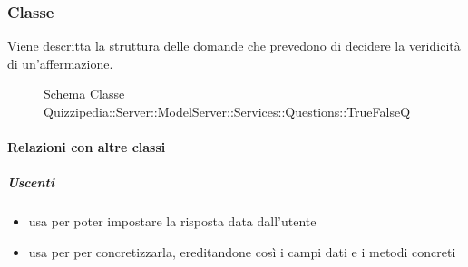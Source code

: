\subsubsection{Classe }
Viene descritta la struttura delle domande che prevedono di decidere la veridicità di un'affermazione.
\begin{figure}[H]
\centering
\noindent{}
\caption[Schema Classe TrueFalseQ]{Schema Classe Quizzipedia::Server::ModelServer::Services::Questions::TrueFalseQ}
\end{figure}
\paragraph{Relazioni con altre classi}
\subparagraph{Uscenti}
\begin{itemize}
\item usa  per poter impostare la risposta data dall'utente
\item usa  per per concretizzarla, ereditandone così i campi dati e i metodi concreti
\end{itemize}

